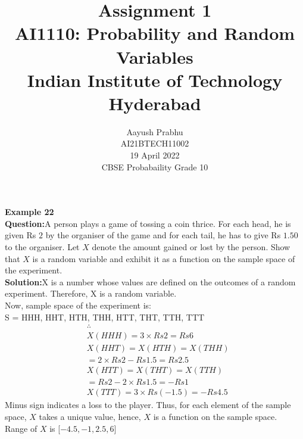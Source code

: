 \documentclass[journal,12pt,twocolumn]{IEEEtran}
\title{Assignment 1 \\ \Large AI1110: Probability and Random Variables \\ \large Indian Institute of Technology Hyderabad}
\author{Aayush Prabhu \\ \normalsize AI21BTECH11002 \\ \vspace*{20pt} \normalsize  19 April 2022 \\ \vspace*{20pt} \Large CBSE Probabaility Grade 10}
\begin{document}
       \maketitle
       \textbf{Example 22}\\
       \textbf{Question:}A person plays a game of tossing a coin thrice. For each head, he is
        given Rs $2$ by the organiser of the game and for each tail, he has to give Rs $1.50$ to the
        organiser. Let $X$ denote the amount gained or lost by the person. Show that $X$ is a
        random variable and exhibit it as a function on the sample space of the experiment.\\
       \textbf{Solution:}X is a number whose values are defined on the outcomes of a random
        experiment. Therefore, X is a random variable.\\
        Now, sample space of the experiment is:\\
        S = {HHH, HHT, HTH, THH, HTT, THT, TTH, TTT}
        \begin{align}
        &\therefore \nonumber\\
        &X(HHH)= 3\times Rs2 = Rs6\\
        &X(HHT)=X(HTH)=X(THH)\nonumber\\
        & =2\times Rs2-Rs1.5=Rs2.5\\
        &X(HTT)=X(THT)=X(TTH)\nonumber\\
        & =Rs2-2\times Rs1.5=-Rs1\\
        &X(TTT)= 3\times Rs(-1.5) = -Rs4.5
        \end{align}
        Minus sign indicates a loss to the player. Thus, for each element of the sample
        space, $X$ takes a unique value, hence, $X$ is a function on the sample space.\\
        Range of $X$ is [$-4.5,-1,2.5,6$]\\
\end{document}
